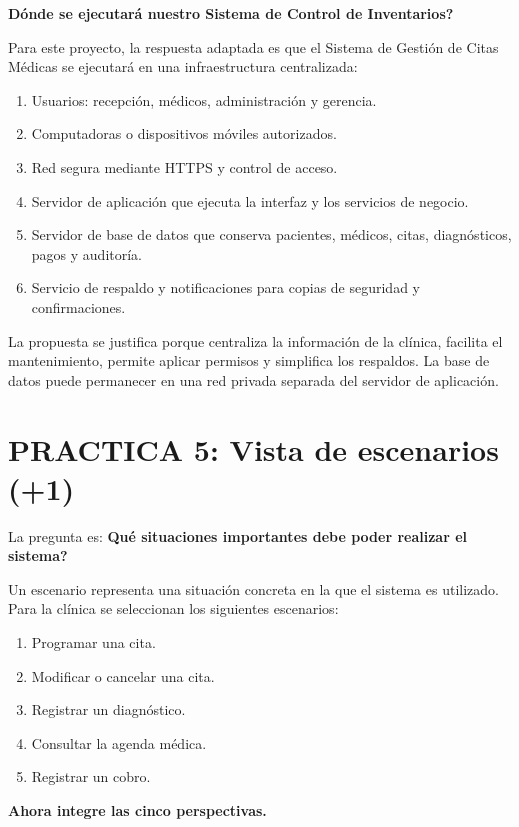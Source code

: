 \textbf{\textquestiondown{}Dónde se ejecutará nuestro Sistema de Control de Inventarios?}

Para este proyecto, la respuesta adaptada es que el Sistema de Gestión de Citas Médicas se ejecutará en una infraestructura centralizada:

\begin{enumerate}
    \item Usuarios: recepción, médicos, administración y gerencia.
    \item Computadoras o dispositivos móviles autorizados.
    \item Red segura mediante HTTPS y control de acceso.
    \item Servidor de aplicación que ejecuta la interfaz y los servicios de negocio.
    \item Servidor de base de datos que conserva pacientes, médicos, citas, diagnósticos, pagos y auditoría.
    \item Servicio de respaldo y notificaciones para copias de seguridad y confirmaciones.
\end{enumerate}

La propuesta se justifica porque centraliza la información de la clínica, facilita el mantenimiento, permite aplicar permisos y simplifica los respaldos. La base de datos puede permanecer en una red privada separada del servidor de aplicación.

\section{PRACTICA 5: Vista de escenarios (+1)}

La pregunta es: \textbf{\textquestiondown{}Qué situaciones importantes debe poder realizar el sistema?}

Un escenario representa una situación concreta en la que el sistema es utilizado. Para la clínica se seleccionan los siguientes escenarios:

\begin{enumerate}
    \item Programar una cita.
    \item Modificar o cancelar una cita.
    \item Registrar un diagnóstico.
    \item Consultar la agenda médica.
    \item Registrar un cobro.
\end{enumerate}

\textbf{Ahora integre las cinco perspectivas.}

